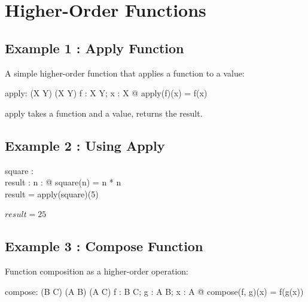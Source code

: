 \documentclass[a4paper,10pt,fleqn]{article}
\begin{document}
\section*{Higher-Order Functions}

\subsection*{Example 1 : Apply Function}

\noindent A simple higher-order function that applies a function to a value:

\bigskip

\begin{gendef}[X, Y]
  apply: (X \fun Y) \fun (X \fun Y)
\where
  \forall f : X \fun Y; x : X @ apply(f)(x) = f(x)
\end{gendef}

\noindent apply takes a function and a value, returns the result.

\bigskip

\subsection*{Example 2 : Using Apply}

\begin{axdef}
square : \nat \fun \nat \\
result : \nat
\where
\forall n : \nat @ square(n) = n * n \\
result = apply(square)(5)
\end{axdef}

\noindent $result = 25$

\bigskip

\subsection*{Example 3 : Compose Function}

\noindent Function composition as a higher-order operation:

\bigskip

\begin{gendef}[A, B, C]
  compose: (B \fun C) \cross (A \fun B) \fun (A \fun C)
\where
  \forall f : B \fun C; g : A \fun B; x : A @ compose(f, g)(x) = f(g(x))
\end{gendef}
\end{document}

